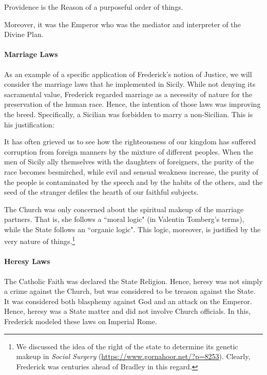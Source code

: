 \begin{quotex}
Providence is the Reason of a purposeful order of things. 

\end{quotex}
Moreover, it was the Emperor who was the mediator and interpreter of the Divine Plan.

\paragraph{Marriage Laws}
As an example of a specific application of Frederick's notion of Justice, we will consider the marriage laws that he implemented in Sicily. While not denying its sacramental value, Frederick regarded marriage as a necessity of nature for the preservation of the human race. Hence, the intention of those laws was improving the breed. Specifically, a Sicilian was forbidden to marry a non-Sicilian. This is his justification:

\begin{quotex}
It has often grieved us to see how the righteousness of our kingdom has suffered corruption from foreign manners by the mixture of different peoples. When the men of Sicily ally themselves with the daughters of foreigners, the purity of the race becomes besmirched, while evil and sensual weakness increase, the purity of the people is contaminated by the speech and by the habits of the others, and the seed of the stranger defiles the hearth of our faithful subjects. 

\end{quotex}
The Church was only concerned about the spiritual makeup of the marriage partners. That is, she follows a ``moral logic" (in Valentin Tomberg's terms), while the State follows an ``organic logic". This logic, moreover, is justified by the very nature of things.\footnote{We discussed the idea of the right of the state to determine its genetic makeup in \textit{Social Surgery} (\url{https://www.gornahoor.net/?p=8253}). Clearly, Frederick was centuries ahead of Bradley in this regard.}

\paragraph{Heresy Laws}
The Catholic Faith was declared the State Religion. Hence, heresy was not simply a crime against the Church, but was considered to be treason against the State. It was considered both blasphemy against God and an attack on the Emperor. Hence, heresy was a State matter and did not involve Church officials. In this, Frederick modeled these laws on Imperial Rome.

